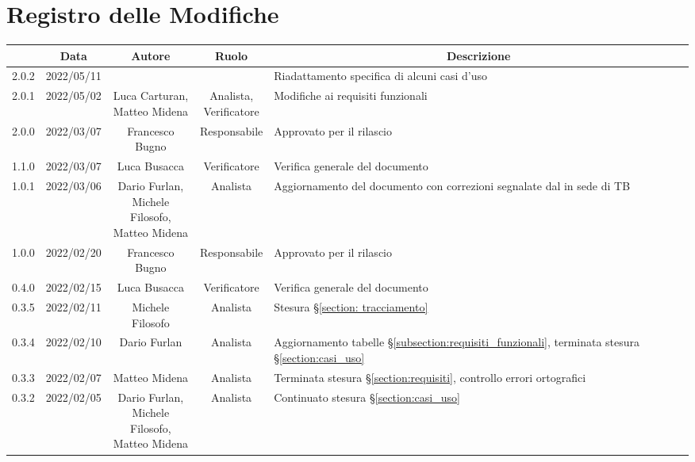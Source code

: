 \thispagestyle{empty}
\section*{Registro delle Modifiche}
\begin{center}
	\renewcommand{\arraystretch}{1.8}
	\begin{longtable}[c]{c | c | c | c | p{5cm}}
		\rowcolor[HTML]{125E28}
		\multicolumn{1}{c}{\color[HTML]{FFFFFF} \textbf{Versione}} &
		\multicolumn{1}{c}{\color[HTML]{FFFFFF} \textbf{Data}}     &
		\multicolumn{1}{c}{\color[HTML]{FFFFFF} \textbf{Autore}}   &
		\multicolumn{1}{c}{\color[HTML]{FFFFFF} \textbf{Ruolo}}    &
		\multicolumn{1}{c}{\color[HTML]{FFFFFF} \textbf{Descrizione}} \\
		\endhead
		2.0.2 & 2022/05/11 & \Longunderstack{Matteo Midena} & \Longunderstack{Analista} & Riadattamento specifica di alcuni casi d'uso\\
		2.0.1 & 2022/05/02 & \Longunderstack{Luca Carturan,\\Matteo Midena} & \Longunderstack{Analista,\\Verificatore} & Modifiche ai requisiti funzionali\\
		2.0.0 & 2022/03/07 & Francesco Bugno & Responsabile & Approvato per il rilascio\\
		1.1.0 & 2022/03/07 & Luca Busacca & Verificatore & Verifica generale del documento\\
		1.0.1 & 2022/03/06 & \Shortunderstack{Dario Furlan,\\Michele Filosofo,\\Matteo Midena} & Analista & Aggiornamento del documento con correzioni segnalate dal \commitNameS{} in sede di TB \\
		1.0.0 & 2022/02/20 & Francesco Bugno & Responsabile & Approvato per il rilascio\\
		0.4.0 & 2022/02/15 & Luca Busacca & Verificatore & Verifica generale del documento\\
		0.3.5 & 2022/02/11 & Michele Filosofo & Analista & Stesura §\ref{section: tracciamento}\\
		0.3.4 & 2022/02/10 & Dario Furlan & Analista & Aggiornamento tabelle §\ref{subsection:requisiti_funzionali}, terminata stesura §\ref{section:casi_uso} \\
		0.3.3 & 2022/02/07 & Matteo Midena & Analista & Terminata stesura §\ref{section:requisiti}, controllo errori ortografici \\
		0.3.2 & 2022/02/05 & \Shortunderstack{Dario Furlan,\\Michele Filosofo,\\Matteo Midena\\} & Analista & Continuato stesura §\ref{section:casi_uso} \\

\end{longtable}
\end{center}
